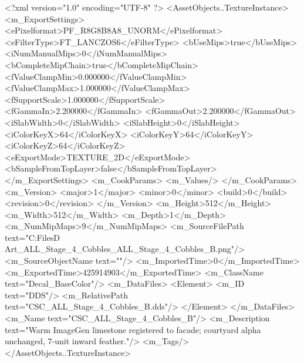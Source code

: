 <?xml version="1.0" encoding="UTF-8" ?>
<AssetObjects..TextureInstance>
	<m_ExportSettings>
		<ePixelformat>PF_R8G8B8A8_UNORM</ePixelformat>
		<eFilterType>FT_LANCZOS6</eFilterType>
		<bUseMips>true</bUseMips>
		<iNumManualMips>0</iNumManualMips>
		<bCompleteMipChain>true</bCompleteMipChain>
		<fValueClampMin>0.000000</fValueClampMin>
		<fValueClampMax>1.000000</fValueClampMax>
		<fSupportScale>1.000000</fSupportScale>
		<fGammaIn>2.200000</fGammaIn>
		<fGammaOut>2.200000</fGammaOut>
		<iSlabWidth>0</iSlabWidth>
		<iSlabHeight>0</iSlabHeight>
		<iColorKeyX>64</iColorKeyX>
		<iColorKeyY>64</iColorKeyY>
		<iColorKeyZ>64</iColorKeyZ>
		<eExportMode>TEXTURE_2D</eExportMode>
		<bSampleFromTopLayer>false</bSampleFromTopLayer>
	</m_ExportSettings>
	<m_CookParams>
		<m_Values/>
	</m_CookParams>
	<m_Version>
		<major>1</major>
		<minor>0</minor>
		<build>0</build>
		<revision>0</revision>
	</m_Version>
	<m_Height>512</m_Height>
	<m_Width>512</m_Width>
	<m_Depth>1</m_Depth>
	<m_NumMipMaps>9</m_NumMipMaps>
	<m_SourceFilePath text="C:\Users\Shadow\Desktop\Working Files\3D Art\Decals\CSC_ALL_Stage_4_Cobbles\CSC_ALL_Stage_4_Cobbles_B.png"/>
	<m_SourceObjectName text=""/>
	<m_ImportedTime>0</m_ImportedTime>
	<m_ExportedTime>425914903</m_ExportedTime>
	<m_ClassName text="Decal_BaseColor"/>
	<m_DataFiles>
		<Element>
			<m_ID text="DDS"/>
			<m_RelativePath text="CSC_ALL_Stage_4_Cobbles_B.dds"/>
		</Element>
	</m_DataFiles>
	<m_Name text="CSC_ALL_Stage_4_Cobbles_B"/>
	<m_Description text="Warm ImageGen limestone registered to facade; courtyard alpha unchanged, 7-unit inward feather."/>
	<m_Tags/>
</AssetObjects..TextureInstance>

